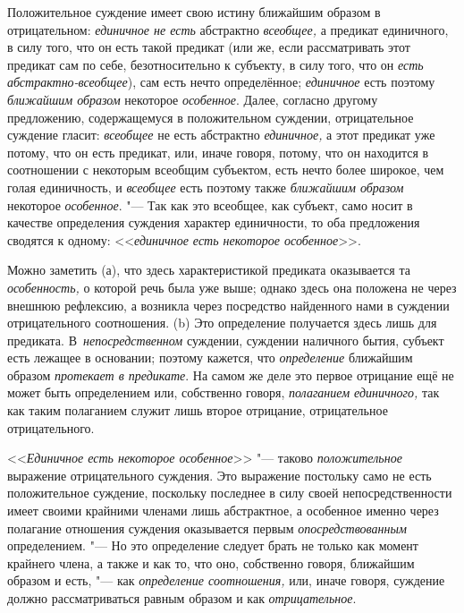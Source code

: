 Положительное суждение имеет свою истину ближайшим образом в отрицательном:
{\em единичное не есть} абстрактно {\em всеобщее,} а предикат единичного, в
силу того, что он есть такой предикат (или же, если рассматривать этот предикат
сам по себе, безотносительно к субъекту, в силу того, что он
{\em есть абстрактно-всеобщее}), сам есть нечто определённое; {\em единичное}
есть поэтому {\em ближайшим образом} некоторое {\em особенное}. Далее, согласно
другому предложению, содержащемуся в положительном суждении, отрицательное
суждение гласит: {\em всеобщее} не есть абстрактно {\em единичное,} а этот
предикат уже потому, что он есть предикат, или, иначе говоря, потому, что он
находится в соотношении с некоторым всеобщим субъектом, есть нечто более
широкое, чем голая единичность, и {\em всеобщее} есть поэтому также
{\em ближайшим образом} некоторое {\em особенное}. "--- Так как это всеобщее,
как субъект, само носит в качестве определения суждения характер единичности,
то оба предложения сводятся к одному:
<<{\em единичное есть некоторое особенное}>>.

Можно заметить (а), что здесь характеристикой предиката оказывается та
{\em особенность,} о которой речь была уже выше; однако здесь она положена не через
внешнюю рефлексию, а возникла через посредство найденного нами в суждении
отрицательного соотношения. (b) Это определение получается здесь лишь для
предиката. В~{\em непосредственном} суждении, суждении наличного бытия,
субъект есть лежащее в основании; поэтому кажется, что {\em определение}
ближайшим образом {\em протекает в предикате}. На самом же деле это первое
отрицание ещё не может быть определением или, собственно говоря,
{\em полаганием единичного,} так как таким полаганием служит лишь второе
отрицание, отрицательное отрицательного.

<<{\em Единичное есть некоторое особенное}>> "--- таково {\em положительное}
выражение отрицательного суждения. Это выражение постольку само не есть
положительное суждение, поскольку последнее в силу своей непосредственности
имеет своими крайними членами лишь абстрактное, а особенное именно через
полагание отношения суждения оказывается первым {\em опосредствованным}
определением. "--- Но это определение следует брать не только как момент
крайнего члена, а также и как то, что оно, собственно говоря, ближайшим образом
и есть, "--- как {\em определение соотношения,} или, иначе говоря, суждение
должно рассматриваться равным образом и как {\em отрицательное}.

